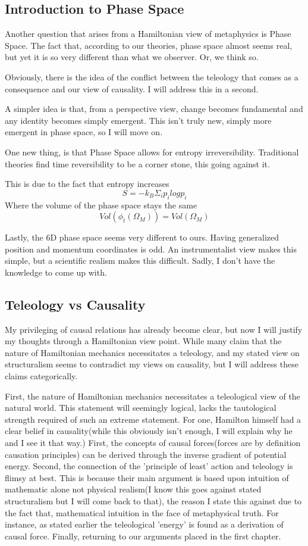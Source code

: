 \subsection{Introduction to Phase Space}
\par Another question that arises from a Hamiltonian view of metaphysics is Phase Space. The fact that, according to our theories, phase space almost seems real, but yet it is so very different than what we observer. Or, we think so.
\par Obviously, there is the idea of the conflict between the teleology that comes as a consequence and our view of causality. I will address this in a second.
\par A simpler idea is that, from a perspective view, change becomes fundamental and any identity becomes simply emergent. This isn't truly new, simply more emergent in phase space, so I will move on.
\par One new thing, is that Phase Space allows for entropy irreversibility. Traditional theories find time reversibility to be a corner stone, this going against it.
\par This is due to the fact that entropy increases
$$S=-k_B\Sigma_i p_i logp_i$$
Where the volume of the phase space stays the same
$$Vol(\phi_t(\Omega_M))=Vol(\Omega_M)$$

\par Lastly, the 6D phase space seems very different to ours. Having generalized position and momentum coordinates is odd. An instrumentalist view makes this simple, but a scientific realism makes this difficult. Sadly, I don't have the knowledge to come up with.
\subsection{Teleology vs Causality}
\par My privileging of causal relations has already become clear, but now I will justify my thoughts through a Hamiltonian view point. While many claim that the nature of Hamiltonian mechanics necessitates a teleology, and my stated view on structuralism seems to contradict my views on causality, but I will address these claims categorically.
\par First, the nature of Hamiltonian mechanics necessitates a teleological view of the natural world. This statement will seemingly logical, lacks the tautological strength required of such an extreme statement. For one, Hamilton himself had a clear belief in causality(while this obviously isn't enough, I will explain why he and I see it that way.) First, the concepts of causal forces(forces are by definition causation principles) can be derived through the inverse gradient of potential energy. Second, the connection of the 'principle of least' action and teleology is flimsy at best. This is because their main argument is based upon intuition of mathematic alone not physical realism(I know this goes against stated structuralism but I will come back to that), the reason I state this against due to the fact that, mathematical intuition in the face of metaphysical truth. For instance, as stated earlier the teleological 'energy' is found as a derivation of causal force. Finally, returning to our arguments placed in the first chapter.
